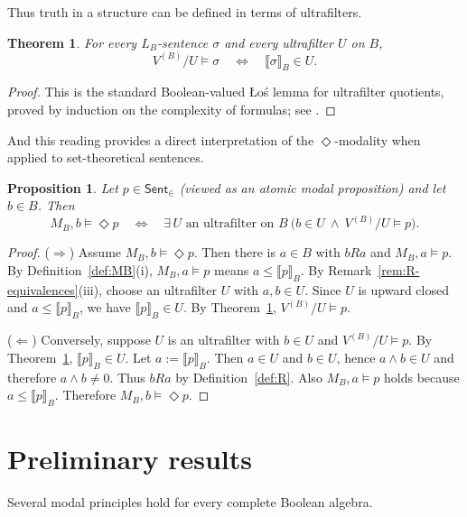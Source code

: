\documentclass[10pt,a4paper]{amsart}
\newtheorem{theorem}[definition]{Theorem}
\newtheorem{proposition}[definition]{Proposition}
\newcommand{\Sent}{\mathsf{Sent}}
\newcommand{\LB}{L_B}     %
\newcommand{\val}[1]{\llbracket #1\rrbracket_B}
\begin{document}
Thus truth in a structure can be defined in terms of ultrafilters.

\begin{theorem}\label{thm:ultrafilter-truth-lemma}
For every $\LB$-sentence $\sigma$ and every ultrafilter $U$ on $B$,
\[
V^{(B)}/U\models \sigma \quad\Longleftrightarrow\quad \val{\sigma}\in U.
\]
\end{theorem}

\begin{proof}
This is the standard Boolean-valued \L o\'s lemma for ultrafilter quotients, proved by induction on the
complexity of formulas; see \cite{Bell,Jech}.
\end{proof}

And this reading provides a direct interpretation of the $\Diamond$-modality when applied to set-theoretical sentences.

\begin{proposition}\label{prop:diamond-ultrafilter-reading}
Let $p\in\Sent_{\in}$ (viewed as an atomic modal proposition) and let $b\in B$.
Then
\[
M_B,b\models \Diamond p
\quad\Longleftrightarrow\quad
\exists\,U\text{ an ultrafilter on }B\ \bigl(b\in U\ \wedge\ V^{(B)}/U\models p\bigr).
\]
\end{proposition}

\begin{proof}
($\Rightarrow$) Assume $M_B,b\models \Diamond p$. Then there is $a\in B$ with $bRa$ and $M_B,a\models p$.
By Definition~\ref{def:MB}(i), $M_B,a\models p$ means $a\le \val{p}$.
By Remark~\ref{rem:R-equivalences}(iii), choose an ultrafilter $U$ with $a,b\in U$.
Since $U$ is upward closed and $a\le \val{p}$, we have $\val{p}\in U$.
By Theorem~\ref{thm:ultrafilter-truth-lemma}, $V^{(B)}/U\models p$.

($\Leftarrow$) Conversely, suppose $U$ is an ultrafilter with $b\in U$ and $V^{(B)}/U\models p$.
By Theorem~\ref{thm:ultrafilter-truth-lemma}, $\val{p}\in U$.
Let $a:=\val{p}$. Then $a\in U$ and $b\in U$, hence $a\wedge b\in U$ and therefore $a\wedge b\neq 0$.
Thus $bRa$ by Definition~\ref{def:R}.
Also $M_B,a\models p$ holds because $a\le \val{p}$.
Therefore $M_B,b\models \Diamond p$.
\end{proof}

\section{Preliminary results}\label{sec:results}

Several modal principles hold for every complete Boolean algebra.
\end{document}
